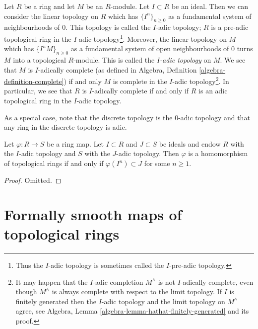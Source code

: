 \noindent
Let $R$ be a ring and let $M$ be an $R$-module. Let $I \subset R$ be
an ideal. Then we can consider the linear topology on $R$ which has
$\{I^n\}_{n \geq 0}$ as a fundamental system of neighbourhoods of $0$.
This topology is called the $I$-adic topology; $R$ is a pre-adic
topological ring in the $I$-adic topology\footnote{Thus the $I$-adic
topology is sometimes called the $I$-pre-adic topology.}. Moreover, the
linear topology
on $M$ which has $\{I^nM\}_{n \geq 0}$ as a fundamental system of open
neighbourhoods of $0$ turns $M$ into a topological $R$-module.
This is called the {\it $I$-adic topology} on $M$. We see that
$M$ is $I$-adically complete (as defined in
Algebra, Definition \ref{algebra-definition-complete})
if and only $M$ is complete in the $I$-adic topology\footnote{
It may happen that the $I$-adic completion $M^\wedge$
is not $I$-adically complete, even though $M^\wedge$
is always complete with respect to the limit topology. If $I$ is finitely
generated then the $I$-adic topology and the limit topology on $M^\wedge$
agree, see Algebra, Lemma \ref{algebra-lemma-hathat-finitely-generated} and
its proof.}.
In particular, we see that $R$ is $I$-adically complete if and
only if $R$ is an adic topological ring in the $I$-adic topology.

\medskip\noindent
As a special case, note that the discrete topology is the $0$-adic
topology and that any ring in the discrete topology is adic.

\begin{lemma}
\label{lemma-continuous}
Let $\varphi : R \to S$ be a ring map.
Let $I \subset R$ and $J \subset S$ be ideals
and endow $R$ with the $I$-adic topology and $S$ with the $J$-adic
topology. Then $\varphi$ is a homomorphism of topological rings
if and only if $\varphi(I^n) \subset J$ for some $n \geq 1$.
\end{lemma}

\begin{proof}
Omitted.
\end{proof}












\section{Formally smooth maps of topological rings}
\label{section-formally-smooth}

